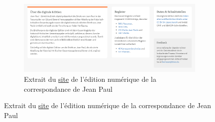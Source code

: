 \documentclass[a4paper, 12pt, twoside]{book}
\begin{document}
\begin{figure}
\begin{subfigure}[b]{0.7\textwidth}
    \end{subfigure}
    \begin{subfigure}[b]{0.7\textwidth}
        \centering
        \includegraphics[width=1\linewidth]{img/jeanpaul_websitepresentation.png}
        \caption{Extrait du \href{https://www.jeanpaul-edition.de/start.html}{site} de l'édition numérique de la correspondance de Jean Paul}
    \end{subfigure}
    \vspace{-10pt}
\end{figure}
\end{document}
